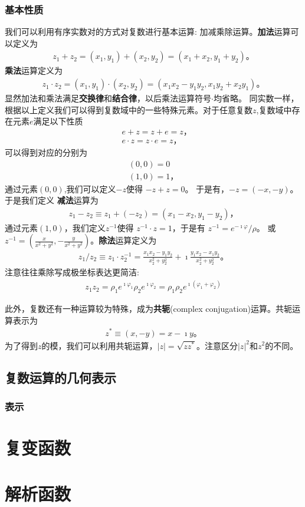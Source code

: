 \subsubsection{基本性质}
我们可以利用有序实数对的方式对复数进行基本运算: 加减乘除运算。{\bf 加法}运算可以定义为
\begin{align}
    z_1 + z_2 = (x_1, y_1) + (x_2, y_2) = (x_1 + x_2, y_1 + y_2) \textrm{。}
\end{align}
{\bf 乘法}运算定义为
\begin{align}
    z_1 \cdot z_2 = (x_1, y_1) \cdot (x_2, y_2) = (x_1 x_2 - y_1 y_2, x_1 y_2 + x_2 y_1) \textrm{。}
\end{align}
显然加法和乘法满足{\bf 交换律}和{\bf 结合律}，以后乘法运算符号$\cdot$均省略。
同实数一样，根据以上定义我们可以得到复数域中的一些特殊元素。对于任意复数$z$,复数域中存在元素$e$满足以下性质
\begin{align}
    & e + z = z + e = z \textrm{，}\\ 
    & e \cdot z = z \cdot e = z \textrm{，} 
\end{align}
可以得到对应的分别为
\begin{align}
    (0, 0) = 0\\
    (1, 0) = 1 \textrm{，}
\end{align}
通过元素$(0,0)$,我们可以定义$-z$使得 $-z + z = 0$。 于是有，$- z = (-x, -y)$。于是我们定义
{\bf 减法}运算为 
\begin{align}
    z_1 - z_2 \equiv z_1 + (-z_2) = (x_1 - x_2, y_1 - y_2) \textrm{，}
\end{align}
通过元素$(1,0)$，我们定义$z^{-1}$使得
$z^{-1} \cdot z = 1$，于是有 $z^{-1} =e^{-\imath \varphi}/\rho  $。
或$z^{-1} = (\frac{x}{x^2 + y^2}, -\frac{y}{x^2 + y^2})$。{\bf 除法}运算定义为
\begin{align}
    z_1 / z_2 \equiv z_1 \cdot z_2^{-1} = \frac{x_1 x_2 - y_1 y_2} {x_2^2  +  y_2^2 }  + \imath \frac{y_1 x_2 - x_1 y_2} {x_2^2  +  y_2^2 } \textrm{。} 
\end{align}
注意往往乘除写成极坐标表达更简洁:
\begin{align}
    z_1 z_2 = \rho_1 e^{\imath \varphi_1 } \rho_2 e^{\imath \varphi_2 } = \rho_1 \rho_2 e^{\imath (\varphi_1 + \varphi_2)}
\end{align}

此外，复数还有一种运算较为特殊，成为{\bf 共轭}(complex conjugation)运算。共轭运算表示为
\begin{align}
    z^{*} \equiv (x, -y) = x - \imath y \textrm{。}
\end{align}
为了得到$z$的模，我们可以利用共轭运算，$|z| = \sqrt{zz^{*}}$。注意区分$|z|^2$和$z^2$的不同。
\subsection{复数运算的几何表示}

\subsubsection{表示}

\section{复变函数}

\section{解析函数}


